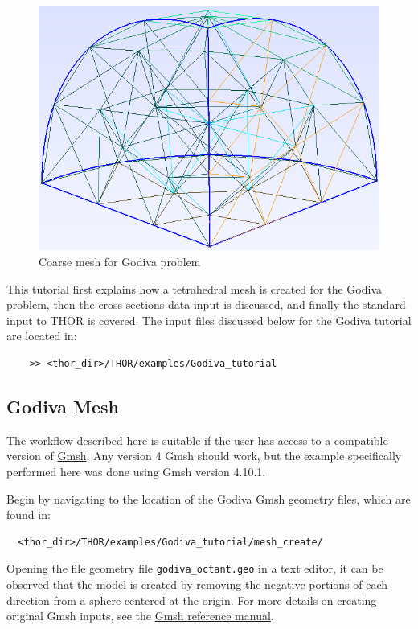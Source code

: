 \begin{figure}[th]
  \includegraphics[width=1.0\textwidth]{chapters/tutorials/figures/godiva_coarse.png}
  \caption{Coarse mesh for Godiva problem}
  \label{fig:godiva_coarse}
\end{figure}

This tutorial first explains how a tetrahedral mesh is created for the Godiva problem, then the cross sections data input is discussed, and finally the standard input to \ac{THOR} is covered.
The input files discussed below for the Godiva tutorial are located in:
\begin{verbatim}
    >> <thor_dir>/THOR/examples/Godiva_tutorial
\end{verbatim}

\subsection{Godiva Mesh}\label{ch:tuts:sec:godiva:ssec:mesh}

The workflow described here is suitable if the user has access to a compatible version of \href{https://gmsh.info/}{Gmsh}.
Any version 4 Gmsh should work, but the example specifically performed here was done using Gmsh version 4.10.1.

Begin by navigating to the location of the Godiva Gmsh geometry files, which are found in:
\begin{verbatim}
  <thor_dir>/THOR/examples/Godiva_tutorial/mesh_create/
\end{verbatim}
Opening the file geometry file \verb"godiva_octant.geo" in a text editor, it can be observed that the model is created by removing the negative portions of each direction from a sphere centered at the origin.
For more details on creating original Gmsh inputs, see the \href{https://gmsh.info/doc/texinfo/gmsh.html}{Gmsh reference manual}.

